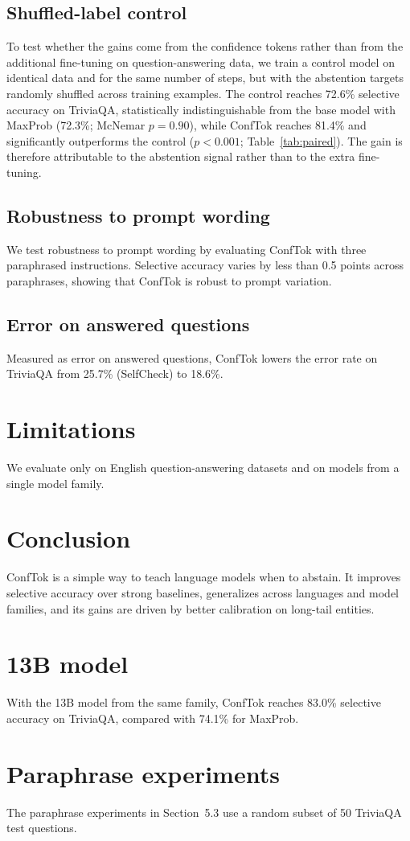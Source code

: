 \documentclass[11pt]{article}
\newcommand{\method}{ConfTok\xspace}
\begin{document}
\subsection{Shuffled-label control}
\label{sec:control}
To test whether the gains come from the confidence tokens rather than from the additional fine-tuning on question-answering data, we train a control model on identical data and for the same number of steps, but with the abstention targets randomly shuffled across training examples.
The control reaches 72.6\% selective accuracy on TriviaQA, statistically indistinguishable from the base model with MaxProb (72.3\%; McNemar $p = 0.90$), while \method reaches 81.4\% and significantly outperforms the control ($p < 0.001$; Table~\ref{tab:paired}).
The gain is therefore attributable to the abstention signal rather than to the extra fine-tuning.

\subsection{Robustness to prompt wording}
We test robustness to prompt wording by evaluating \method with three paraphrased instructions.
Selective accuracy varies by less than 0.5 points across paraphrases, showing that \method is robust to prompt variation.

\subsection{Error on answered questions}
Measured as error on answered questions, \method lowers the error rate on TriviaQA from 25.7\% (SelfCheck) to 18.6\%.

\section{Limitations}
We evaluate only on English question-answering datasets and on models from a single model family.

\section{Conclusion}
\method is a simple way to teach language models when to abstain.
It improves selective accuracy over strong baselines, generalizes across languages and model families, and its gains are driven by better calibration on long-tail entities.




\appendix
\section{13B model}
\label{app:13b}
With the 13B model from the same family, \method reaches 83.0\% selective accuracy on TriviaQA, compared with 74.1\% for MaxProb.

\section{Paraphrase experiments}
The paraphrase experiments in Section~5.3 use a random subset of 50 TriviaQA test questions.
\end{document}
